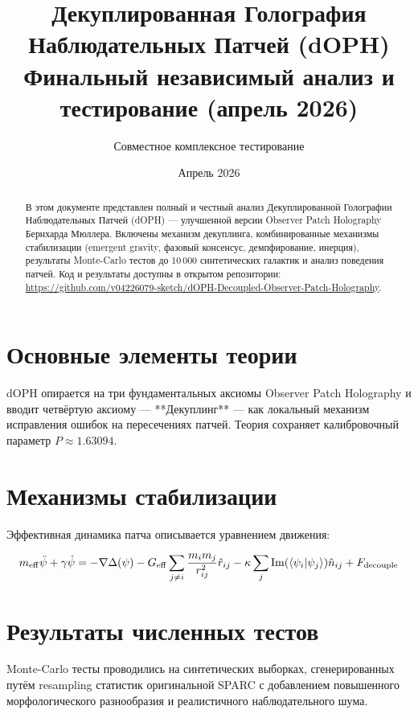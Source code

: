 \documentclass[11pt,a4paper]{article}
\title{\textbf{Декуплированная Голография Наблюдательных Патчей (dOPH)}\\
\textbf{Финальный независимый анализ и тестирование (апрель 2026)}}
\author{Совместное комплексное тестирование}
\date{Апрель 2026}
\begin{document}
\maketitle

\begin{abstract}
В этом документе представлен полный и честный анализ Декуплированной Голографии Наблюдательных Патчей (dOPH) — улучшенной версии Observer Patch Holography Бернхарда Мюллера. 
Включены механизм декуплинга, комбинированные механизмы стабилизации (emergent gravity, фазовый консенсус, демпфирование, инерция), результаты Monte-Carlo тестов до 10\,000 синтетических галактик и анализ поведения патчей. 
Код и результаты доступны в открытом репозитории: \url{https://github.com/v04226079-sketch/dOPH-Decoupled-Observer-Patch-Holography}.
\end{abstract}

\section{Основные элементы теории}

dOPH опирается на три фундаментальных аксиомы Observer Patch Holography и вводит четвёртую аксиому — **Декуплинг** — как локальный механизм исправления ошибок на пересечениях патчей. 
Теория сохраняет калибровочный параметр \(P \approx 1.63094\).

\section{Механизмы стабилизации}

Эффективная динамика патча описывается уравнением движения:

\[
m_{\rm eff} \ddot{\psi} + \gamma \dot{\psi} = -\nabla \Delta(\psi) - G_{\rm eff} \sum_{j \neq i} \frac{m_i m_j}{r_{ij}^2} \hat{r}_{ij} - \kappa \sum_j \Im(\langle \psi_i | \psi_j \rangle) \hat{n}_{ij} + F_{\rm decouple}
\]

\section{Результаты численных тестов}

Monte-Carlo тесты проводились на синтетических выборках, сгенерированных путём resampling статистик оригинальной SPARC с добавлением повышенного морфологического разнообразия и реалистичного наблюдательного шума.
\end{document}
